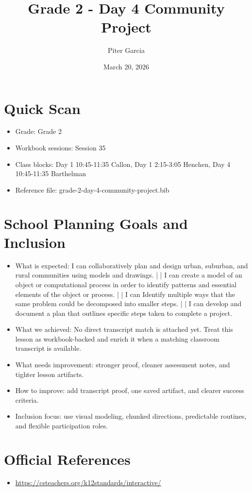 \documentclass[11pt]{article}
\title{Grade 2 - Day 4 Community Project}
\author{Piter Garcia}
\date{March 20, 2026}
\begin{document}
\maketitle
\section*{Quick Scan}
\begin{itemize}[leftmargin=*]
\item Grade: Grade 2
\item Workbook sessions: Session 35
\item Class blocks: Day 1 10:45-11:35 Callon, Day 1 2:15-3:05 Henchen, Day 4 10:45-11:35 Barthelman
\item Reference file: grade-2-day-4-community-project.bib
\end{itemize}
\section*{School Planning Goals and Inclusion}
\begin{itemize}[leftmargin=*]
\item What is expected: I can collaboratively plan and design urban, suburban, and rural communities using models and drawings. | | I can create a model of an object or computational process in order to identify patterns and essential elements of the object or process. | | I can Identify multiple ways that the same problem could be decomposed into smaller steps. | | I can develop and document a plan that outlines specific steps taken to complete a project.
\item What we achieved: No direct transcript match is attached yet. Treat this lesson as workbook-backed and enrich it when a matching classroom transcript is available.
\item What needs improvement: stronger proof, cleaner assessment notes, and tighter lesson artifacts.
\item How to improve: add transcript proof, one saved artifact, and clearer success criteria.
\item Inclusion focus: use visual modeling, chunked directions, predictable routines, and flexible participation roles.
\end{itemize}
\section*{Official References}
\begin{itemize}[leftmargin=*]
\item \url{https://csteachers.org/k12standards/interactive/}

\end{itemize}
\end{document}
